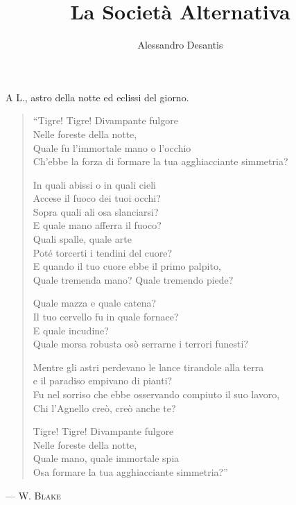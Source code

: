 \documentclass[a4paper,12pt]{book}
\title{La Società Alternativa}
\author{Alessandro Desantis}
\date{}
\begin{document}
\maketitle

\begin{flushright}
A L., astro della notte ed eclissi del giorno.
\end{flushright}

\clearpage

\begin{verse}
\itshape{
``Tigre! Tigre! Divampante fulgore\\
Nelle foreste della notte,\\
Quale fu l'immortale mano o l'occhio\\
Ch'ebbe la forza di formare la tua agghiacciante simmetria?

In quali abissi o in quali cieli\\
Accese il fuoco dei tuoi occhi?\\
Sopra quali ali osa slanciarsi?\\
E quale mano afferra il fuoco?\\
Quali spalle, quale arte\\
Poté torcerti i tendini del cuore?\\
E quando il tuo cuore ebbe il primo palpito,\\
Quale tremenda mano? Quale tremendo piede?

Quale mazza e quale catena?\\
Il tuo cervello fu in quale fornace?\\
E quale incudine?\\
Quale morsa robusta osò serrarne i terrori funesti?

Mentre gli astri perdevano le lance tirandole alla terra\\
e il paradiso empivano di pianti?\\
Fu nel sorriso che ebbe osservando compiuto il suo lavoro,\\
Chi l'Agnello creò, creò anche te?

Tigre! Tigre! Divampante fulgore\\
Nelle foreste della notte,\\
Quale mano, quale immortale spia\\
Osa formare la tua agghiacciante simmetria?''
\/}
\end{verse}

\begin{flushright}
--- \scshape{W. Blake}
\end{flushright}
\end{document}
